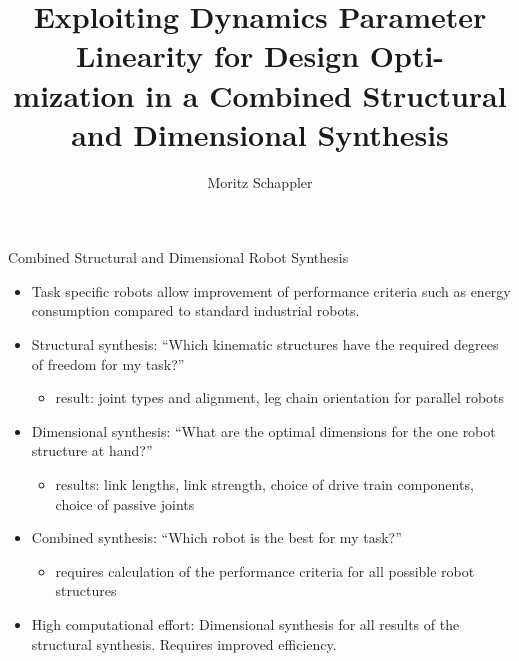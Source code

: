 \documentclass[c]{beamer}
\author[moritz.schappler@imes.uni-hannover.de]{Moritz Schappler}
\title{Exploiting Dynamics Parameter Linearity for Design Opti-\\mization in a Combined Structural and Dimensional Synthesis}
\institute{Institute of Mechatronic Systems}
\newcommand{\postersubsection}[1]{%
\setlength\fboxsep{0pt}%
\vfil\penalty125\vfilneg\vskip1.5ex
\colorbox{Grau}{\parbox[b]{\columnwidth}{\vskip0.75ex%
\Large\hskip1ex #1%
\vskip0.75ex}}%
}
\begin{document}
\begin{frame}
\begin{block}{Combined Structural and Dimensional Robot Synthesis}
\parbox{\linewidth}{
\begin{multicols}{2}
\begin{itemize}
    \item Task specific robots allow improvement of performance criteria such as energy consumption compared to standard industrial robots.
    \item Structural synthesis: ``Which kinematic structures have the required degrees of freedom for my task?'' 
    \begin{itemize}
    \item result: joint types and alignment, leg chain orientation for parallel robots
    \end{itemize}
    \item Dimensional synthesis: ``What are the optimal dimensions for the one robot structure at hand?'' 
    \begin{itemize}
        \item results: link lengths, link strength, choice of drive train components, choice of passive joints
    \end{itemize}
    \item Combined synthesis: ``Which robot is the best for my task?''
    \begin{itemize}
        \item requires calculation of the performance criteria for all possible robot structures
    \end{itemize}
    \item High computational effort: Dimensional synthesis for all results of the structural synthesis. Requires improved efficiency.
\end{itemize}

\begin{figure}[t]
    \centering
	
\end{figure}



\end{multicols}}
\end{block}
\end{frame}
\end{document}
